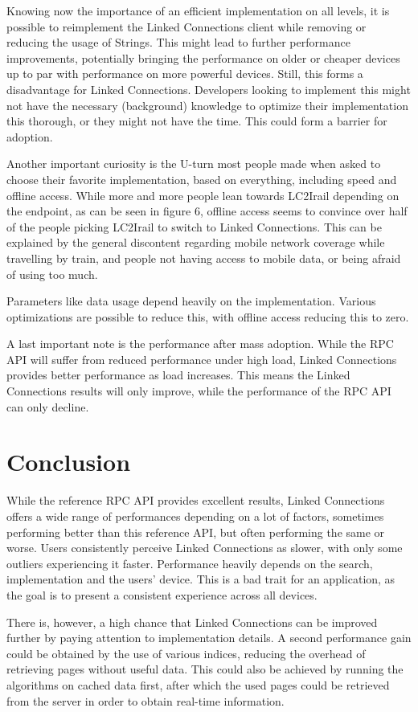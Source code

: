 \documentclass[twocolumn]{phdsymp} %
\begin{document}
Knowing now the importance of an efficient implementation on all levels, it is possible to reimplement the Linked Connections client while removing or reducing the usage of
Strings. This might lead to further performance improvements, potentially bringing the performance on older or cheaper devices up to par with performance on more powerful devices. Still, this forms a disadvantage for Linked Connections. Developers looking to implement this might not have the necessary (background) knowledge to optimize
their implementation this thorough, or they might not have the time. This could form a barrier for adoption.

Another important curiosity is the U-turn most people made when asked to choose their favorite implementation, based on everything, including speed and offline access.
While more and more people lean towards LC2Irail depending on the endpoint, as can be seen in figure 6, offline access seems to convince over half of the people picking LC2Irail to switch to Linked Connections. This can be explained by the general discontent regarding mobile network coverage while travelling by train, and people not having access to mobile data, or being afraid of using too much.

Parameters like data usage depend heavily on the implementation. Various optimizations are possible to reduce this, with offline access reducing this to zero.

A last important note is the performance after mass adoption. While the RPC API will suffer from reduced performance under high load, Linked Connections provides better performance as load increases. This means the Linked Connections results will only improve, while the performance of the RPC API can only decline.

\section{Conclusion}
While the reference RPC API provides excellent results, Linked Connections offers a wide range of performances depending on a lot of factors, sometimes performing better
than this reference API, but often performing the same or worse. Users consistently perceive Linked Connections as slower, with only some outliers experiencing it faster. Performance heavily depends on the search, implementation and the users’ device. This is a bad trait for an application, as the goal is to present a consistent experience across all devices.

There is, however, a high chance that Linked Connections can be improved further by paying attention to implementation details. A second performance gain could be obtained by the use of various indices, reducing the overhead of retrieving pages without useful data. This could also be achieved by running the algorithms on cached data first, after which the used pages could be retrieved from the server in order to obtain real-time information.
\end{document}
